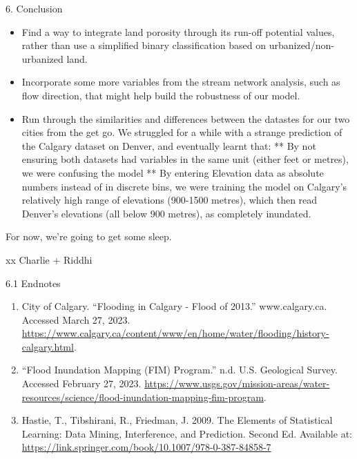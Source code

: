 \documentclass[
  ignorenonframetext,
]{beamer}
\begin{document}
\begin{frame}{6. Conclusion}
\begin{itemize}
\item
  Find a way to integrate land porosity through its run-off potential
  values, rather than use a simplified binary classification based on
  urbanized/non-urbanized land.
\item
  Incorporate some more variables from the stream network analysis, such
  as flow direction, that might help build the robustness of our model.
\item
  Run through the similarities and differences between the datastes for
  our two cities from the get go. We struggled for a while with a
  strange prediction of the Calgary dataset on Denver, and eventually
  learnt that: ** By not ensuring both datasets had variables in the
  same unit (either feet or metres), we were confusing the model ** By
  entering Elevation data as absolute numbers instead of in discrete
  bins, we were training the model on Calgary's relatively high range of
  elevations (900-1500 metres), which then read Denver's elevations (all
  below 900 metres), as completely inundated.
\end{itemize}

For now, we're going to get some sleep.

xx Charlie + Riddhi

\begin{block}{6.1 Endnotes}
\protect\hypertarget{endnotes}{}
\begin{enumerate}
\item
  City of Calgary. ``Flooding in Calgary - Flood of 2013.''
  www.calgary.ca. Accessed March 27, 2023.
  \url{https://www.calgary.ca/content/www/en/home/water/flooding/history-calgary.html}.
\item
  ``Flood Inundation Mapping (FIM) Program.'' n.d. U.S. Geological
  Survey. Accessed February 27, 2023.
  \url{https://www.usgs.gov/mission-areas/water-resources/science/flood-inundation-mapping-fim-program}.
\item
  Hastie, T., Tibshirani, R., Friedman, J. 2009. The Elements of
  Statistical Learning: Data Mining, Interference, and Prediction.
  Second Ed. Available at:
  \url{https://link.springer.com/book/10.1007/978-0-387-84858-7}
\end{enumerate}
\end{block}
\end{frame}
\end{document}
